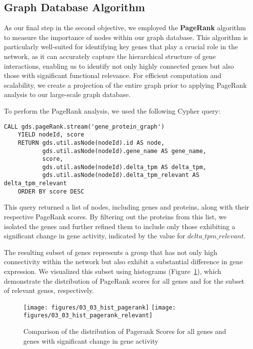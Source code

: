 \subsection{Graph Database Algorithm} \label{subsec:graph_database_algo}



As our final step in the second objective,
we employed the \textbf{PageRank} algorithm to measure the importance of nodes within our graph database.
This algorithm is particularly well-suited for identifying key genes that play a crucial role in the network,
as it can accurately capture the hierarchical structure of gene interactions,
enabling us to identify not only highly connected genes but also those with significant functional relevance.
For efficient computation and scalability,
we create a projection of the entire graph prior to applying PageRank analysis to our large-scale graph database.

To perform the PageRank analysis, we used the following Cypher query:
\begin{lstlisting}[language=Cypher, label={lst:pagerank}]
    CALL gds.pageRank.stream('gene_protein_graph')
    YIELD nodeId, score
    RETURN gds.util.asNode(nodeId).id AS node,
           gds.util.asNode(nodeId).gene_name AS gene_name,
           score,
           gds.util.asNode(nodeId).delta_tpm AS delta_tpm,
           gds.util.asNode(nodeId).delta_tpm_relevant AS delta_tpm_relevant
    ORDER BY score DESC
\end{lstlisting}

This query returned a list of nodes, including genes and proteins, along with their respective PageRank scores.
By filtering out the proteins from this list, we isolated the genes and
further refined them to include only those exhibiting a significant change in gene activity,
indicated by the value for $delta\_tpm\_relevant$.

The resulting subset of genes represents a group that has not only high connectivity
within the network but also exhibit a substantial difference in gene expression.
We visualized this subset using histograms (Figure~\ref{fig:03_02_hist_pagerank}),
which demonstrate the distribution of PageRank scores for all genes and for the subset of relevant genes, respectively.

\begin{figure}[h]
        \texttt{[image: figures/03\_03\_hist\_pagerank]}
    \endminipage
    \hfill
      \texttt{[image: figures/03\_03\_hist\_pagerank\_relevant]}
    \endminipage
    \caption{Comparison of the distribution of Pagerank Scores for all genes and genes with significant change in gene activity}
    \label{fig:03_02_hist_pagerank}
\end{figure}
